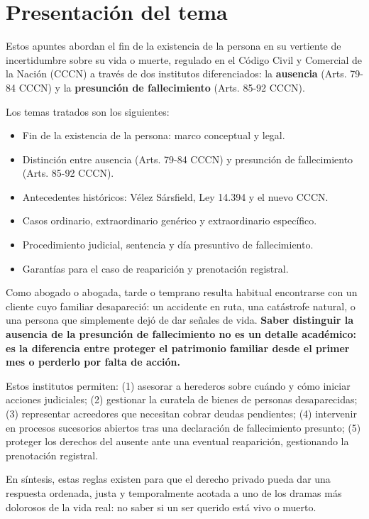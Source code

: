 \documentclass[12pt,oneside]{book}
\begin{document}
\chapter*{Presentación del tema}

Estos apuntes abordan el fin de la existencia de la persona en su vertiente
de incertidumbre sobre su vida o muerte, regulado en el Código Civil y
Comercial de la Nación (CCCN) a través de dos institutos diferenciados: la
\textbf{ausencia} (Arts. 79-84 CCCN) y la \textbf{presunción de
fallecimiento} (Arts. 85-92 CCCN).

Los temas tratados son los siguientes:

\begin{itemize}
    \item Fin de la existencia de la persona: marco conceptual y legal.
    \item Distinción entre ausencia (Arts. 79-84 CCCN) y presunción de fallecimiento (Arts. 85-92 CCCN).
    \item Antecedentes históricos: Vélez Sársfield, Ley 14.394 y el nuevo CCCN.
    \item Casos ordinario, extraordinario genérico y extraordinario específico.
    \item Procedimiento judicial, sentencia y día presuntivo de fallecimiento.
    \item Garantías para el caso de reaparición y prenotación registral.
\end{itemize}

\begin{note}
Como abogado o abogada, tarde o temprano resulta habitual encontrarse con un
cliente cuyo familiar desapareció: un accidente en ruta, una catástrofe
natural, o una persona que simplemente dejó de dar señales de vida.
\textbf{Saber distinguir la ausencia de la presunción de fallecimiento no es
un detalle académico: es la diferencia entre proteger el patrimonio familiar
desde el primer mes o perderlo por falta de acción.}

Estos institutos permiten: (1) asesorar a herederos sobre cuándo y cómo
iniciar acciones judiciales; (2) gestionar la curatela de bienes de personas
desaparecidas; (3) representar acreedores que necesitan cobrar deudas
pendientes; (4) intervenir en procesos sucesorios abiertos tras una
declaración de fallecimiento presunto; (5) proteger los derechos del
ausente ante una eventual reaparición, gestionando la prenotación
registral.

En síntesis, estas reglas existen para que el derecho privado pueda dar una
respuesta ordenada, justa y temporalmente acotada a uno de los dramas más
dolorosos de la vida real: no saber si un ser querido está vivo o muerto.
\end{note}
\end{document}
